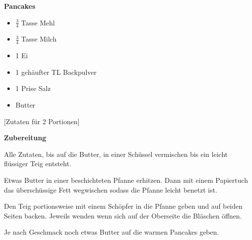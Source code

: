 

\parindent0pt	

\pagestyle{empty}


\textbf{{\LARGE Pancakes}}%

\hrulefill
\vspace*{\fill}
\begin{multicols}{2}	


\begin{itemize}
\item $\frac{3}{4}$ Tasse Mehl
\item $\frac{3}{4}$ Tasse Milch
\item 1 Ei
\item 1 gehäufter TL Backpulver
\item 1 Prise Salz
\item Butter
\end{itemize}
\end{multicols}
\vfill									%

\vspace{2cm}
%
\begin{center}
%
[Zutaten für 2 Portionen]%
\end{center}


\vfill
\newpage
\textbf{{\LARGE Zubereitung}}%

\hrulefill

\vspace*{\fill}
\begin{multicols}{2}

Alle Zutaten, bis auf die Butter, in einer Schüssel vermischen bis ein leicht flüssiger Teig entsteht.\newline

Etwas Butter in einer beschichteten Pfanne erhitzen. Dann mit einem Papiertuch das überschüssige Fett
wegwischen sodass die Pfanne leicht benetzt ist.\newline

Den Teig portionsweise mit einem Schöpfer in die Pfanne geben und auf beiden Seiten backen. Jeweils wenden
wenn sich auf der Oberseite die Bläschen öffnen.\newline

Je nach Geschmack noch etwas Butter auf die warmen Pancakes geben.

\end{multicols}
\vfill
